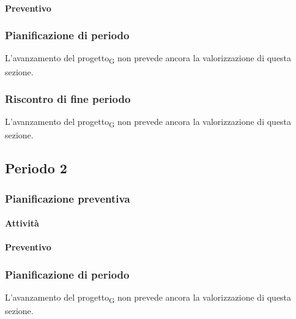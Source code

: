 \paragraph{Preventivo}

\smallPreventivoTable{
	
}

\subsubsection{Pianificazione di periodo}

L'avanzamento del progetto\textsubscript{G} non prevede ancora la valorizzazione di questa sezione.


\subsubsection{Riscontro di fine periodo}


L'avanzamento del progetto\textsubscript{G} non prevede ancora la valorizzazione di questa sezione.



\subsection{Periodo 2}

\subsubsection{Pianificazione preventiva}

\paragraph{Attività}

\planningTable{
	
}

\paragraph{Preventivo}

\smallPreventivoTable{
	
}

\subsubsection{Pianificazione di periodo}


L'avanzamento del progetto\textsubscript{G} non prevede ancora la valorizzazione di questa sezione.



